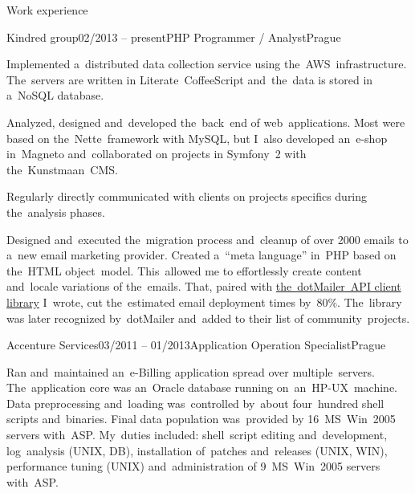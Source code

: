 \documentclass{resume}
\begin{document}
    \begin{rSection}{Work experience}

        \begin{rSubsection}{Kindred group}{02/2013 -- present}{PHP Programmer / Analyst}{Prague}

            \item Implemented a~distributed data collection service using the~AWS~infrastructure.
            The~servers are written in Literate~CoffeeScript and~the~data is stored in a~NoSQL database.

            \item Analyzed, designed and~developed the~back~end of web~applications.
            Most were based on the~Nette~framework with MySQL,
            but I~also developed an~e-shop in~Magneto and~collaborated on projects in Symfony~2 with the~Kunstmaan~CMS.

            \item Regularly directly communicated with clients on projects specifics during the~analysis phases.

            \item Designed and~executed the~migration process and~cleanup of over 2000 emails to a~new email marketing provider.
            Created a~“meta language” in~PHP based on the~HTML object~model.
            This~allowed me to effortlessly create content and~locale variations of the~emails.
            That, paired with
            \href{https://github.com/romanpitak/dotMailer-API-v2-PHP-client}{the~dotMailer~API client library}
            I~wrote, cut the~estimated email deployment times by~80\%.
            The~library was later recognized by~dotMailer and~added to their list of community~projects.
        \end{rSubsection}

        \begin{rSubsection}{Accenture Services}{03/2011 -- 01/2013}{Application Operation Specialist}{Prague}
            \item Ran and~maintained an~e-Billing application spread over multiple~servers.
            The~application core was \mbox{an Oracle} database running on~an~HP-UX~machine.
            Data preprocessing and~loading was~controlled by~about four~hundred shell scripts and~binaries.
            Final data population was~provided by 16~MS~Win~2005 servers with~ASP.
            My~duties included: shell~script editing and~development, log~analysis (UNIX, DB),
            installation of~patches and~releases (UNIX, WIN), performance tuning (UNIX)
            and~administration of 9~MS~Win~2005 servers with~ASP.


\end{rSubsection}
\end{rSection}
\end{document}
